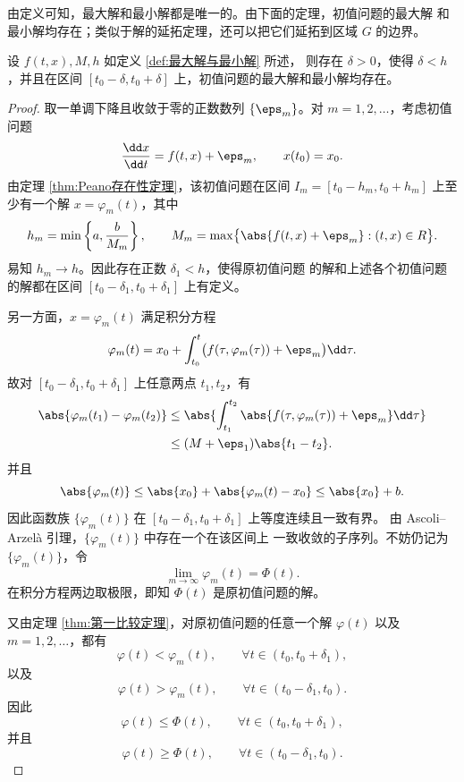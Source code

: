 由定义可知，最大解和最小解都是唯一的。由下面的定理，初值问题的最大解
和最小解均存在；类似于解的延拓定理，还可以把它们延拓到区域 $G$ 的边界。

\begin{proposition}\label{thm:最大解与最小解的局部存在性}
	设 $f(t,x),M,h$ 如定义 \ref{def:最大解与最小解} 所述，
	则存在 $\delta>0$，使得 $\delta<h$，并且在区间
	$[t_0-\delta,t_0+\delta]$ 上，初值问题的最大解和最小解均存在。
\end{proposition}

\begin{proof}
	取一单调下降且收敛于零的正数数列 $\{\eps_m\}$。对
	$m=1,2,\ldots$，考虑初值问题
	\[
		\dfrac{\dd x}{\dd t}=f(t,x)+\eps_m,
		\qquad x(t_0)=x_0.
	\]
	由定理 \ref{thm:Peano存在性定理}，该初值问题在区间
	$I_m=[t_0-h_m,t_0+h_m]$ 上至少有一个解 $x=\varphi_m(t)$，其中
	\[
		h_m=\min\left\{a,\dfrac{b}{M_m}\right\},
		\qquad
		M_m=\max\bigl\{\abs{f(t,x)+\eps_m}:(t,x)\in R\bigr\}.
	\]
	易知 $h_m\to h$。因此存在正数 $\delta_1<h$，使得原初值问题
	的解和上述各个初值问题的解都在区间
	$[t_0-\delta_1,t_0+\delta_1]$ 上有定义。

	另一方面，$x=\varphi_m(t)$ 满足积分方程
	\[
		\varphi_m(t)=x_0+\int_{t_0}^{t}
		\bigl(f(\tau,\varphi_m(\tau))+\eps_m\bigr)\dd\tau.
	\]
	故对 $[t_0-\delta_1,t_0+\delta_1]$ 上任意两点 $t_1,t_2$，有
	\[
	\begin{aligned}
		\abs{\varphi_m(t_1)-\varphi_m(t_2)}
		&\leq
		\abs{\int_{t_1}^{t_2}
		\abs{f(\tau,\varphi_m(\tau))+\eps_m}\dd\tau}\\
		&\leq(M+\eps_1)\abs{t_1-t_2}.
	\end{aligned}
	\]
	并且
	\[
		\abs{\varphi_m(t)}
		\leq\abs{x_0}+\abs{\varphi_m(t)-x_0}
		\leq\abs{x_0}+b.
	\]
	因此函数族 $\{\varphi_m(t)\}$ 在
	$[t_0-\delta_1,t_0+\delta_1]$ 上等度连续且一致有界。
	由 Ascoli--Arzelà 引理，$\{\varphi_m(t)\}$ 中存在一个在该区间上
	一致收敛的子序列。不妨仍记为 $\{\varphi_m(t)\}$，令
	\[
		\lim_{m\to\infty}\varphi_m(t)=\Phi(t).
	\]
	在积分方程两边取极限，即知 $\Phi(t)$ 是原初值问题的解。

	又由定理 \ref{thm:第一比较定理}，对原初值问题的任意一个解
	$\varphi(t)$ 以及 $m=1,2,\ldots$，都有
	\[
		\varphi(t)<\varphi_m(t),
		\qquad \forall t\in(t_0,t_0+\delta_1),
	\]
	以及
	\[
		\varphi(t)>\varphi_m(t),
		\qquad \forall t\in(t_0-\delta_1,t_0).
	\]
	因此
	\[
		\varphi(t)\leq\Phi(t),
		\qquad \forall t\in(t_0,t_0+\delta_1),
	\]
	并且
	\[
		\varphi(t)\geq\Phi(t),
		\qquad \forall t\in(t_0-\delta_1,t_0).
	\]


\end{proof}
